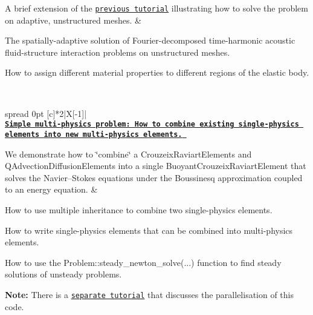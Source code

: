 \begin{longtabu}
A brief extension of the \href{../../fourier_decomposed_acoustic_fsi/sphere/html/index.html}{\tt previous tutorial} illustrating how to solve the problem on adaptive, unstructured meshes.  &
\begin{DoxyItemize}
\item The spatially-\/adaptive solution of Fourier-\/decomposed time-\/harmonic acoustic fluid-\/structure interaction problems on unstructured meshes.
\item How to assign different material properties to different regions of the elastic body. 
\end{DoxyItemize}



\\
\end{longtabu}
\tabulinesep=1mm
\begin{longtabu} spread 0pt [c]{*{2}{|X[-1]}|}
\hline
{}\\
\label{_bous}%
 \href{../../multi_physics/b_convection/html/index.html}{\tt {\bfseries  Simple multi-\/physics problem\+: How to combine existing single-\/physics elements into new multi-\/physics elements.} }

We demonstrate how to \char`\"{}combine\char`\"{} a {\ttfamily Crouzeix\+Raviart\+Elements} and {\ttfamily Q\+Advection\+Diffusion\+Elements} into a single {\ttfamily Buoyant\+Crouzeix\+Raviart\+Element} that solves the Navier--Stokes equations under the Boussinesq approximation coupled to an energy equation.  &
\begin{DoxyItemize}
\item How to use multiple inheritance to combine two single-\/physics elements.
\item How to write single-\/physics elements that can be combined into multi-\/physics elements.
\item How to use the {\ttfamily Problem\+::steady\+\_\+newton\+\_\+solve}(...) function to find steady solutions of unsteady problems.
\item {\bfseries Note\+:} There is a \href{../../mpi/boussinesq_convection/html/index.html}{\tt separate tutorial} that discusses the parallelisation of this code. 
\end{DoxyItemize}


\end{longtabu}
